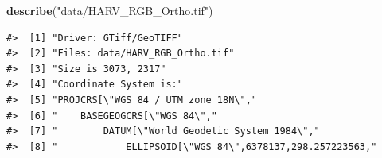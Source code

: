 \documentclass[
]{book}
\newenvironment{Shaded}{\begin{snugshade}}{\end{snugshade}}
\newcommand{\FunctionTok}[1]{\textcolor[rgb]{0.13,0.29,0.53}{\textbf{#1}}}
\newcommand{\NormalTok}[1]{#1}
\newcommand{\StringTok}[1]{\textcolor[rgb]{0.31,0.60,0.02}{#1}}
\begin{document}
\begin{Shaded}
\begin{Highlighting}[]
\FunctionTok{describe}\NormalTok{(}\StringTok{"data/HARV\_RGB\_Ortho.tif"}\NormalTok{)}
\end{Highlighting}
\end{Shaded}

\begin{verbatim}
#>  [1] "Driver: GTiff/GeoTIFF"                                                                                                                                                                                                                                                          
#>  [2] "Files: data/HARV_RGB_Ortho.tif"                                                                                                                                                                                                                                                 
#>  [3] "Size is 3073, 2317"                                                                                                                                                                                                                                                             
#>  [4] "Coordinate System is:"                                                                                                                                                                                                                                                          
#>  [5] "PROJCRS[\"WGS 84 / UTM zone 18N\","                                                                                                                                                                                                                                             
#>  [6] "    BASEGEOGCRS[\"WGS 84\","                                                                                                                                                                                                                                                    
#>  [7] "        DATUM[\"World Geodetic System 1984\","                                                                                                                                                                                                                                  
#>  [8] "            ELLIPSOID[\"WGS 84\",6378137,298.257223563,"                                                                                                                                                                                                                        

\end{verbatim}
\end{document}

